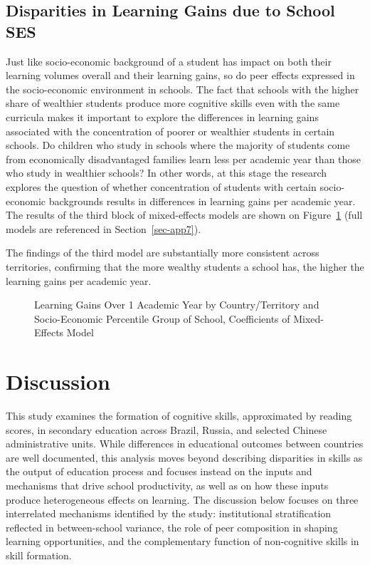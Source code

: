 \documentclass[
]{article}
\begin{document}
\subsection{Disparities in Learning Gains due to School
SES}\label{disparities-in-learning-gains-due-to-school-ses}

Just like socio-economic background of a student has impact on both
their learning volumes overall and their learning gains, so do peer
effects expressed in the socio-economic environment in schools. The fact
that schools with the higher share of wealthier students produce more
cognitive skills even with the same curricula makes it important to
explore the differences in learning gains associated with the
concentration of poorer or wealthier students in certain schools. Do
children who study in schools where the majority of students come from
economically disadvantaged families learn less per academic year than
those who study in wealthier schools? In other words, at this stage the
research explores the question of whether concentration of students with
certain socio-economic backgrounds results in differences in learning
gains per academic year. The results of the third block of mixed-effects
models are shown on Figure~\ref{fig-m3} (full models are referenced in
Section~\ref{sec-app7}).

The findings of the third model are substantially more consistent across
territories, confirming that the more wealthy students a school has, the
higher the learning gains per academic year.

\begin{figure}


\caption{\label{fig-m3}Learning Gains Over 1 Academic Year by
Country/Territory and Socio-Economic Percentile Group of School,
Coefficients of Mixed-Effects Model}

\end{figure}%

\section{Discussion}\label{discussion}

This study examines the formation of cognitive skills, approximated by
reading scores, in secondary education across Brazil, Russia, and
selected Chinese administrative units. While differences in educational
outcomes between countries are well documented, this analysis moves
beyond describing disparities in skills as the output of education
process and focuses instead on the inputs and mechanisms that drive
school productivity, as well as on how these inputs produce
heterogeneous effects on learning. The discussion below focuses on three
interrelated mechanisms identified by the study: institutional
stratification reflected in between-school variance, the role of peer
composition in shaping learning opportunities, and the complementary
function of non-cognitive skills in skill formation.
\end{document}
